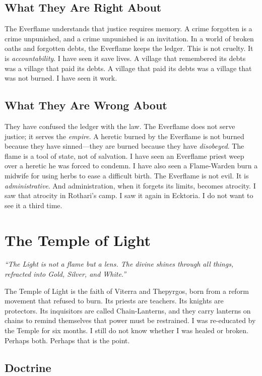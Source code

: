 \documentclass{book}
\begin{document}
\subsection{What They Are Right About}

The Everflame understands that justice requires memory. A crime forgotten is a crime unpunished, and a crime unpunished is an invitation. In a world of broken oaths and forgotten debts, the Everflame keeps the ledger. This is not cruelty. It is \textit{accountability}. I have seen it save lives. A village that remembered its debts was a village that paid its debts. A village that paid its debts was a village that was not burned. I have seen it work.

\subsection{What They Are Wrong About}

They have confused the ledger with the law. The Everflame does not serve justice; it serves the \textit{empire}. A heretic burned by the Everflame is not burned because they have sinned---they are burned because they have \textit{disobeyed}. The flame is a tool of state, not of salvation. I have seen an Everflame priest weep over a heretic he was forced to condemn. I have also seen a Flame-Warden burn a midwife for using herbs to ease a difficult birth. The Everflame is not evil. It is \textit{administrative}. And administration, when it forgets its limits, becomes atrocity. I saw that atrocity in Rothari's camp. I saw it again in Ecktoria. I do not want to see it a third time.

\section{The Temple of Light}

\textit{``The Light is not a flame but a lens. The divine shines through all things, refracted into Gold, Silver, and White.''}

The Temple of Light is the faith of Viterra and Thepyrgos, born from a reform movement that refused to burn. Its priests are teachers. Its knights are protectors. Its inquisitors are called Chain-Lanterns, and they carry lanterns on chains to remind themselves that power must be restrained. I was re-educated by the Temple for six months. I still do not know whether I was healed or broken. Perhaps both. Perhaps that is the point.

\subsection{Doctrine}
\end{document}
